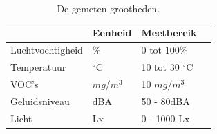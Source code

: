 \begin{table}[ht]
    \centering
    \begin{tabular}{l||l|l|l}
        & Eenheid & Meetbereik\\
        \hline
        Luchtvochtigheid & \%          & 0 tot 100\%           & \cite{palonen1993effects}  \\
        Temperatuur      & $^{\circ}$C & 10 tot 30 $^{\circ}$C & \cite{palonen1993effects}  \\
        VOC's            & \(mg/m^3\)  & 10 \(mg/m^3\)         & \cite{voc-luchtkwaliteit}  \\
        Geluidsniveau    & dBA         & 50 - 80dBA            & \cite{geluid-levels}       \\
        Licht            & Lx          & 0 - 1000 Lx           & \cite{lightingIndorWorkspaces}
    \end{tabular}
    \caption{De gemeten grootheden.}
    \label{tab:grootheden}
\end{table}

 